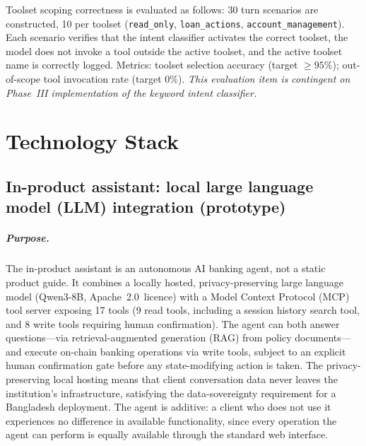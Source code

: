 \documentclass[12pt,a4paper]{report}
\begin{document}
\begin{enumerate}[noitemsep]
Toolset scoping correctness is evaluated as follows: 30 turn scenarios are
constructed, 10 per toolset (\texttt{read\_only}, \texttt{loan\_actions},
\texttt{account\_management}). Each scenario verifies that the intent classifier
activates the correct toolset, the model does not invoke a tool outside the active
toolset, and the active toolset name is correctly logged. Metrics: toolset selection
accuracy (target $\geq 95\%$); out-of-scope tool invocation rate (target $0\%$).
\textit{This evaluation item is contingent on Phase~III implementation of the
keyword intent classifier.}
\end{enumerate}


\appendix

\chapter{Technology Stack}

\section{In-product assistant: local large language model (LLM) integration (prototype)}

\paragraph{Purpose.}
The in-product assistant is an autonomous AI banking agent, not a static product guide. It combines a locally hosted, privacy-preserving large language model (Qwen3-8B, Apache~2.0~licence) with a Model Context Protocol (MCP) tool server exposing 17 tools (9 read tools, including a session history search tool, and 8 write tools requiring human confirmation). The agent can both answer questions---via retrieval-augmented generation (RAG) from policy documents---and execute on-chain banking operations via write tools, subject to an explicit human confirmation gate before any state-modifying action is taken. The privacy-preserving local hosting means that client conversation data never leaves the institution's infrastructure, satisfying the data-sovereignty requirement for a Bangladesh deployment. The agent is additive: a client who does not use it experiences no difference in available functionality, since every operation the agent can perform is equally available through the standard web interface.
\end{document}
